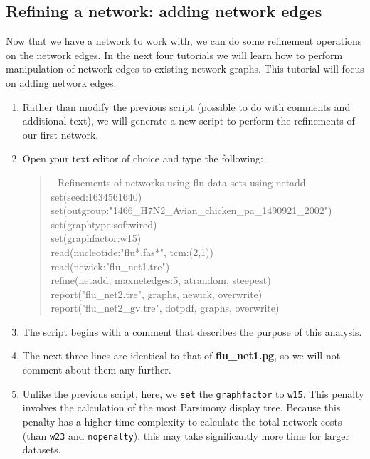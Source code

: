 \documentclass[11pt]{article}
\begin{document}
\subsection{Refining a network: adding network edges}
\label{subsec:netadd}

Now that we have a network to work with, we can do some refinement operations 
on the network edges. In the next four tutorials we will learn how to perform 
manipulation of network edges to existing network graphs. This tutorial will 
focus on adding network edges.

\begin {enumerate}

\item Rather than modify the previous script (possible to do with comments and 
additional text), we will generate a new script to perform the refinements of our
first network.

\item Open your text editor of choice and type the following:

	\begin{quote}	
	-\/-Refinements of networks using flu data sets using netadd\\
	set(seed:1634561640)\\
	set(outgroup:"1466\_H7N2\_Avian\_chicken\_pa\_1490921\_2002")\\
	set(graphtype:softwired)\\
	set(graphfactor:w15)\\ 
	read(nucleotide:"flu*.fas*", tcm:(2,1))\\
	read(newick:"flu\_net1.tre")\\
	refine(netadd, maxnetedges:5, atrandom, steepest)\\
	report("flu\_net2.tre", graphs, newick, overwrite)\\
	report("flu\_net2\_gv.tre", dotpdf, graphs, overwrite)
	\end{quote}

\item The script begins with a comment that describes the purpose of this 
analysis.

\item The next three lines are identical to that of \textbf{flu\_net1.pg}, so we 
will not comment about them any further. 

\item Unlike the previous script, here, we \texttt{set} the \texttt{graphfactor} to 
\texttt{w15}. This penalty involves the calculation of the most Parsimony 
display tree. Because this penalty has a higher time complexity to calculate 
the total network costs (than \texttt{w23} and \texttt{nopenalty}), this may take 
significantly more time for larger datasets. 


\end{enumerate}
\end{document}
